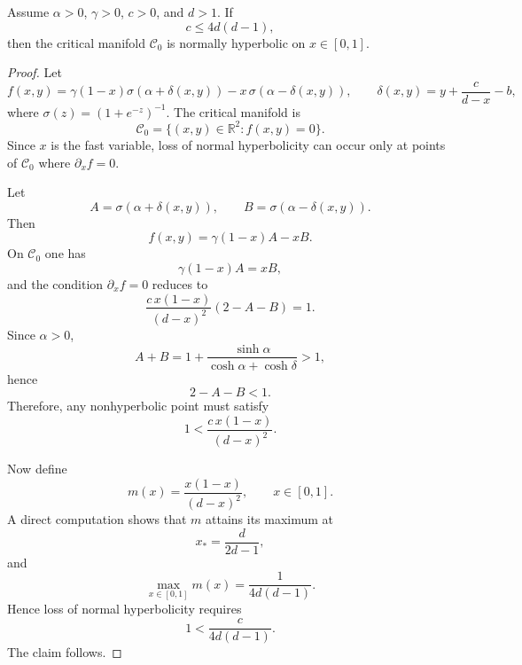 \documentclass[10pt,a4paper]{amsart}
\begin{document}
\begin{proposition}\label{prop:NH_simple}
Assume $\alpha>0$, $\gamma>0$, $c>0$, and $d>1$. If
\[
c\le 4d(d-1),
\]
then the critical manifold $\mathcal C_0$ is normally hyperbolic on $x\in[0,1]$.

\end{proposition}

\begin{proof}
Let
\[
f(x,y)=\gamma(1-x)\sigma(\alpha+\delta(x,y))-x\,\sigma(\alpha-\delta(x,y)),
\qquad
\delta(x,y)=y+\frac{c}{d-x}-b,
\]
where $\sigma(z)=(1+e^{-z})^{-1}$. The critical manifold is
\[
\mathcal C_0=\{(x,y)\in\mathbb R^2:f(x,y)=0\}.
\]
Since $x$ is the fast variable, loss of normal hyperbolicity can occur only at points of $\mathcal C_0$ where $\partial_x f=0$.

Let
\[
A=\sigma(\alpha+\delta(x,y)),
\qquad
B=\sigma(\alpha-\delta(x,y)).
\]
Then
\[
f(x,y)=\gamma(1-x)A-xB.
\]
On $\mathcal C_0$ one has
\[
\gamma(1-x)A=xB,
\]
and the condition $\partial_x f=0$ reduces to
\[
\frac{c\,x(1-x)}{(d-x)^2}(2-A-B)=1.
\]
Since $\alpha>0$,
\[
A+B
=
1+\frac{\sinh\alpha}{\cosh\alpha+\cosh\delta}
>1,
\]
hence
\[
2-A-B<1.
\]
Therefore, any nonhyperbolic point must satisfy
\begin{equation}\label{eq:cond_nh}
    1<\frac{c\,x(1-x)}{(d-x)^2}.
\end{equation}

Now define
\[
m(x)=\frac{x(1-x)}{(d-x)^2},
\qquad x\in[0,1].
\]
A direct computation shows that $m$ attains its maximum at
\[
x_*=\frac{d}{2d-1},
\]
and
\[
\max_{x\in[0,1]}m(x)=\frac{1}{4d(d-1)}.
\]
Hence loss of normal hyperbolicity requires
\[
1<\frac{c}{4d(d-1)}.
\]
The claim follows.
\end{proof}
\end{document}
